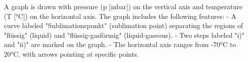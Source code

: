 A graph is drawn with pressure (p [mbar]) on the vertical axis and temperature (T [°C]) on the horizontal axis. The graph includes the following features:  
- A curve labeled "Sublimationspunkt" (sublimation point) separating the regions of "flüssig" (liquid) and "flüssig-gasförmig" (liquid-gaseous).  
- Two steps labeled "i)" and "ii)" are marked on the graph.  
- The horizontal axis ranges from -70°C to 20°C, with arrows pointing at specific points.
